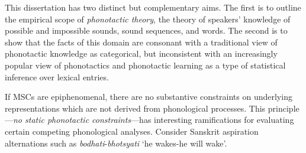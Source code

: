 \label{intro}

This dissertation has two distinct but complementary aims. 
The first is to outline the empirical scope of \emph{phonotactic theory}, the theory of speakers' knowledge of possible and impossible sounds, sound sequences, and words.
The second is to show that the facts of this domain are consonant with a traditional view of phonotactic knowledge as categorical, but inconsistent with an increasingly popular view of phonotactics and phonotactic learning as a type of statistical inference over lexical entries.

If MSCs are epiphenomenal, there are no substantive constraints on underlying representations which are not derived from phonological processes.
This principle---\emph{no static phonotactic constraints}---has interesting ramifications for evaluating certain competing phonological analyses.
Consider Sanskrit aspiration alternations such as \emph{bodhati}-\emph{bhotsyati} `he wakes-he will wake'.


